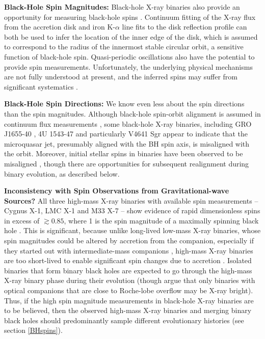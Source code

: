 \documentclass[review]{elsarticle}
\begin{document}
\textbf{Black-Hole Spin Magnitudes:} Black-hole X-ray binaries also provide an opportunity for measuring black-hole spins \citep[see][for recent reviews]{MillerMiller:2015,Reynolds:2020}.  Continuum fitting of the X-ray flux from the accretion disk and iron K-$\alpha$ line fits to the disk reflection profile can both be used to infer the location of the inner edge of the disk, which is assumed to correspond to the radius of the innermost stable circular orbit, a sensitive function of black-hole spin.  Quasi-periodic oscillations also have the potential to provide spin measurements.  Unfortunately, the underlying physical mechanisms are not fully understood at present, and the inferred spins may suffer from significant systematics \citep[e.g.,][]{Basak:2017,Kawano:2017}.  

\textbf{Black-Hole Spin Directions:} We know even less about the spin directions than the spin magnitudes.  Although black-hole spin-orbit alignment is assumed in continuum flux measurements \citep{MillerMiller:2015}, some black-hole X-ray binaries, including GRO J1655-40 \citep{Martin:2008}, 4U 1543-47 \citep{MorningstarMiller:2014} and particularly V4641 Sgr \citep{Orosz:2001,Martin:2008b} appear to indicate that the microquasar jet, presumably aligned with the BH spin axis, is misaligned with the orbit.  Moreover, initial stellar spins in binaries have been observed to be misaligned \citep[e.g.,][]{Albrecht:2009,Albrecht:2014}, though there are opportunities for subsequent realignment during binary evolution, as described below.

\textbf{Inconsistency with Spin Observations from Gravitational-wave Sources?} 
All three high-mass X-ray binaries with available spin measurements -- Cygnus X-1, LMC X-1 and M33 X-7 -- show evidence of rapid dimensionless spins in excess of $\gtrsim 0.85$, where 1 is the spin magnitude of a maximally spinning black hole \citep{Reynolds:2020}.  This is significant, because unlike long-lived low-mass X-ray binaries, whose spin magnitudes could be altered by accretion from the companion, especially if they started out with intermediate-mass companions \citep{Podsiadlowski:2003,Fragos:2015}, high-mass X-ray binaries are too short-lived to enable significant spin changes due to accretion \citep{KingKolb:1999}.  Isolated binaries that form binary black holes are expected to go through the high-mass X-ray binary phase during their evolution (though \citet{HiraiMandel:2021} argue that only binaries with optical companions that are close to Roche-lobe overflow may be X-ray bright).  Thus, if the high spin magnitude measurements in black-hole X-ray binaries are to be believed, then the observed high-mass X-ray binaries and merging binary black holes should predominantly sample different evolutionary histories (see section \ref{BHspins}).
\end{document}
